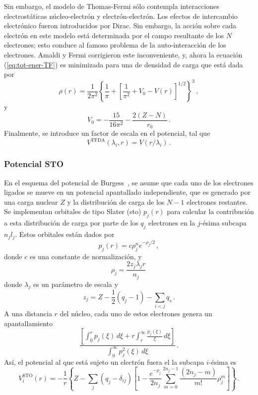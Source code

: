 Sin embargo, el modelo de Thomas-Fermi sólo contempla interacciones 
electrostáticas núcleo-electrón y electrón-electrón. Los efectos de 
intercambio electrónico fueron introducidos por Dirac. Sin embargo, la 
acción sobre cada electrón en este modelo está determinada por el campo 
resultante de los $N$ electrones; esto conduce al famoso problema de la 
auto-interacción de los electrones. Amaldi y Fermi corrigieron este 
inconveniente, y, ahora la ecuación (\ref{eq:tot-ener-TF}) es minimizada
para una de densidad de carga que está dada por
\begin{equation}
\rho(r)=\frac{1}{2\pi^2}\left\{\frac{1}{\pi}+\left[\frac{1}{\pi^2}+V_0-
V(r)\right]^{1/2}\right\}^3\,,
\end{equation}
y
\begin{equation}
V_0=-\frac{15}{16\pi^2}-\frac{2(Z-N)}{r_0}\,.
\end{equation}
Finalmente, se introduce un factor de escala en el potencial, tal que
\begin{equation*}
 V^{\textrm{TFDA}}(\lambda_i,r) = V(r/\lambda_i)\,.
\label{eq:TFDA-pot}
\end{equation*}

\subsubsection*{Potencial STO}

En el esquema del potencial de Burgess~\cite{Burgess:89}, se asume que 
cada uno de los electrones ligados se mueve en un potencial apantallado 
independiente, que es generado por una carga nuclear $Z$ y la 
distribución de carga de los $N-1$ electrones restantes. Se implementan 
orbitales de tipo Slater (\acs{sto}) $p_j(r)$ para calcular la 
contribución a esta distribución de carga por parte de los $q_j$ 
electrones en la $j$-ésima subcapa $n_jl_j$. Estos orbitales están dados 
por
\begin{equation}
p_j(r) = c\rho_j^n e^{-\rho_j/2}\,,
\end{equation}
donde $c$ es una constante de normalización, y 
\begin{equation}
\rho_j= \frac{2z_j\lambda_jr}{n_j}\,
\end{equation}
donde $\lambda_j$ es un parámetro de escala y 
\begin{equation}
z_j=Z-\frac{1}{2}\left(q_j-1\right)-\sum_{i<j} q_s\,.
\end{equation}
A una distancia $r$ del núcleo, cada uno de estos electrones genera un 
apantallamiento 
\begin{equation}
\frac{\left[\int_0^r p_j(\xi)\,d\xi +r\int_r^{\infty}
\frac{p_j(\xi)}{\xi}\,d\xi\right]}{\int_0^{\infty}p_j^2(\xi)\,d\xi}\,.
\end{equation}
Así, el potencial al que está sujeto un electrón fuera el la subcapa 
$i$-ésima es
\begin{equation}
V_i^{\textrm{STO}}(r)=-\frac{1}{r}\left\{Z-\sum_j(q_j-\delta_{ij})\left[1-
\frac{e^{-\rho_j}}{2n_j}\sum_{m=0}^{2n_j-1}\frac{(2n_j-m)}{m!}\rho_j^m
\right]\right\}\,.
\label{eq:STO-pot}
\end{equation}

